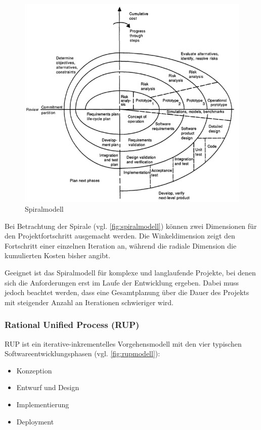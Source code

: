 \begin{figure}
  \centering
  \includegraphics[width=\textwidth]{img/spiralmodell.png}
  \caption{Spiralmodell \parencite[][]{Boehm:1988aa}}
  \label{fig:spiralmodell}
\end{figure}

Bei Betrachtung der Spirale (vgl. \autoref{fig:spiralmodell}) können zwei Dimensionen für den Projektfortschritt ausgemacht werden.
Die Winkeldimension zeigt den Fortschritt einer einzelnen Iteration an, während die radiale Dimension die kumulierten Kosten bisher angibt.
\parencite[][S. 65]{Boehm:1988aa}

Geeignet ist das Spiralmodell für komplexe und langlaufende Projekte, bei denen sich die Anforderungen erst im Laufe der Entwicklung ergeben. 
Dabei muss jedoch beachtet werden, dass eine Gesamtplanung über die Dauer des Projekts mit steigender Anzahl an Iterationen schwieriger wird. \parencite[][S. 58]{Schatten:2010aa}

\subsubsection{Rational Unified Process (RUP)}

RUP ist ein iterative-inkrementelles Vorgehensmodell mit den vier typischen Softwareentwicklungsphasen (vgl. \autoref{fig:rupmodell}):

\begin{itemize}
\item Konzeption
\item Entwurf und Design
\item Implementierung
\item Deployment
\end{itemize}

